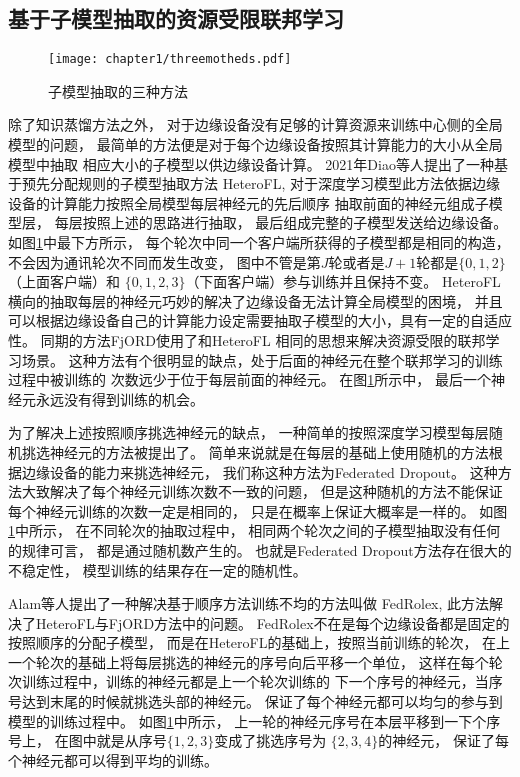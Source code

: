 \subsection{基于子模型抽取的资源受限联邦学习}
\label{sec:sub-extract}
\begin{figure}[htbp]
    \centering
    \texttt{[image: chapter1/threemotheds.pdf]}
    \caption{\label{fig:1-1threemethods}子模型抽取的三种方法}
\end{figure}

除了知识蒸馏方法之外，
对于边缘设备没有足够的计算资源来训练中心侧的全局模型的问题，
最简单的方法便是对于每个边缘设备按照其计算能力的大小从全局模型中抽取
相应大小的子模型以供边缘设备计算。
2021年Diao等人提出了一种基于预先分配规则的子模型抽取方法
HeteroFL\cite{DBLP:conf/iclr/Diao0T21},
对于深度学习模型此方法依据边缘设备的计算能力按照全局模型每层神经元的先后顺序
抽取前面的神经元组成子模型层，
每层按照上述的思路进行抽取，
最后组成完整的子模型发送给边缘设备。
如图\ref{fig:1-1threemethods}中最下方所示，
每个轮次中同一个客户端所获得的子模型都是相同的构造，
不会因为通讯轮次不同而发生改变，
图中不管是第$J$轮或者是$J+1$轮都是$\{ 0, 1, 2 \}$（上面客户端）和
$\{0, 1, 2, 3 \}$（下面客户端）参与训练并且保持不变。
HeteroFL横向的抽取每层的神经元巧妙的解决了边缘设备无法计算全局模型的困境，
并且可以根据边缘设备自己的计算能力设定需要抽取子模型的大小，具有一定的自适应性。
同期的方法FjORD\cite{DBLP:conf/nips/HorvathLALVL21}使用了和HeteroFL
相同的思想来解决资源受限的联邦学习场景。
这种方法有个很明显的缺点，处于后面的神经元在整个联邦学习的训练过程中被训练的
次数远少于位于每层前面的神经元。
在图\ref{fig:1-1threemethods}所示中，
最后一个神经元永远没有得到训练的机会。

为了解决上述按照顺序挑选神经元的缺点，
一种简单的按照深度学习模型每层随机挑选神经元的方法被提出了。
简单来说就是在每层的基础上使用随机的方法根据边缘设备的能力来挑选神经元，
我们称这种方法为Federated Dropout\cite{caldas2018expanding}。
这种方法大致解决了每个神经元训练次数不一致的问题，
但是这种随机的方法不能保证每个神经元训练的次数一定是相同的，
只是在概率上保证大概率是一样的。
如图\ref{fig:1-1threemethods}中所示，
在不同轮次的抽取过程中，
相同两个轮次之间的子模型抽取没有任何的规律可言，
都是通过随机数产生的。
也就是Federated Dropout方法存在很大的不稳定性，
模型训练的结果存在一定的随机性。

Alam等人提出了一种解决基于顺序方法训练不均的方法叫做
FedRolex\cite{DBLP:conf/nips/AlamLYZ22},
此方法解决了HeteroFL与FjORD方法中的问题。
FedRolex不在是每个边缘设备都是固定的按照顺序的分配子模型，
而是在HeteroFL的基础上，按照当前训练的轮次，
在上一个轮次的基础上将每层挑选的神经元的序号向后平移一个单位，
这样在每个轮次训练过程中，训练的神经元都是上一个轮次训练的
下一个序号的神经元，当序号达到末尾的时候就挑选头部的神经元。
保证了每个神经元都可以均匀的参与到模型的训练过程中。
如图\ref{fig:1-1threemethods}中所示，
上一轮的神经元序号在本层平移到一下个序号上，
在图中就是从序号$\{1,2, 3 \}$变成了挑选序号为
$\{2, 3, 4 \}$的神经元，
保证了每个神经元都可以得到平均的训练。

